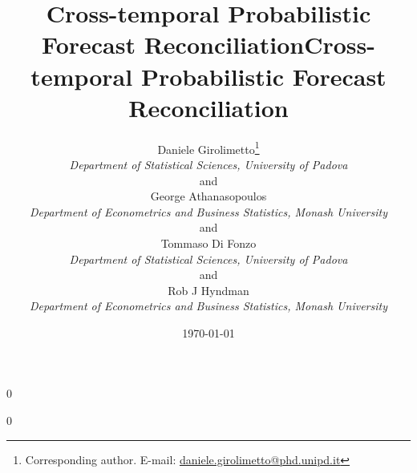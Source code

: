 \documentclass[12pt]{article}
\newcommand{\blind}{0}
\theoremstyle{definition}
\begin{document}
%

\def\spacingset#1{\renewcommand{\baselinestretch}%
{#1}\small\normalsize} \spacingset{1}



\blind
{
  \title{\bf Cross-temporal Probabilistic Forecast Reconciliation\vspace{-0.3cm}}
  \author{\normalsize Daniele Girolimetto\thanks{Corresponding author. E-mail: \href{mailto:daniele.girolimetto@phd.unipd.it}{daniele.girolimetto@phd.unipd.it}}\\[-0.1cm]
 \normalsize \textit{Department of Statistical Sciences, University of Padova}\\[-0.1cm]
\normalsize  and\\[-0.1cm]
 \normalsize George Athanasopoulos\\[-0.1cm]
 \normalsize \textit{Department of Econometrics and Business Statistics, Monash University}\\[-0.1cm]
  \normalsize and\\[-0.1cm]
   \normalsize Tommaso Di Fonzo\\[-0.1cm]
 \normalsize \textit{Department of Statistical Sciences, University of Padova}\\[-0.1cm]
 \normalsize and\\[-0.1cm]
  \normalsize Rob J Hyndman\\[-0.1cm]
 \normalsize \textit{Department of Econometrics and Business Statistics, Monash University}}
\date{\normalsize\today\vspace{-0.6cm}}
  \maketitle
} \fi


\blind
{
  \title{\bf Cross-temporal Probabilistic Forecast Reconciliation}
  \maketitle
  \bigskip
} \fi
\end{document}
